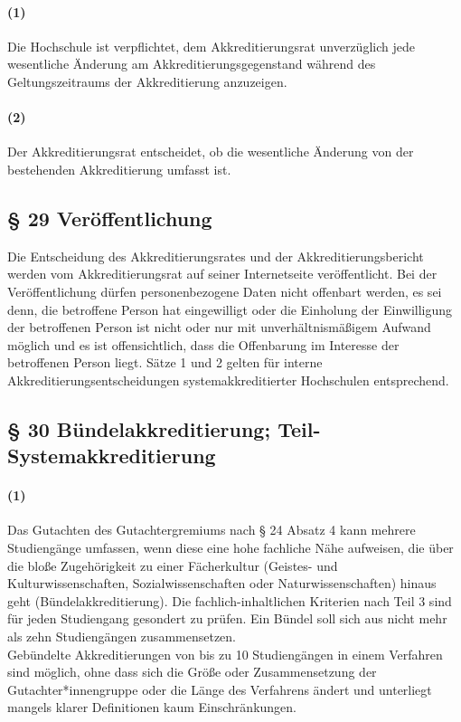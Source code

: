 \documentclass[a4paper]{scrartcl}
\begin{document}
\paragraph{(1) }Die Hochschule ist verpflichtet, dem Akkreditierungsrat unverzüglich jede wesentliche Änderung am Akkreditierungsgegenstand während des Geltungszeitraums der Akkreditierung anzuzeigen.
\paragraph{(2)} Der Akkreditierungsrat entscheidet, ob die wesentliche Änderung von der bestehenden Akkreditierung umfasst ist.
\subsection{§ 29 Veröffentlichung}
Die Entscheidung des Akkreditierungsrates und der Akkreditierungsbericht werden vom Akkreditierungsrat auf seiner Internetseite veröffentlicht. Bei der Veröffentlichung dürfen personenbezogene Daten nicht offenbart werden, es sei denn, die betroffene Person hat eingewilligt oder die Einholung der Einwilligung der betroffenen Person ist nicht oder nur mit unverhältnismäßigem Aufwand möglich und es ist offensichtlich, dass die Offenbarung im Interesse der betroffenen Person liegt. Sätze 1 und 2 gelten für interne Akkreditierungsentscheidungen systemakkreditierter Hochschulen entsprechend.
\subsection{§ 30 Bündelakkreditierung; Teil-Systemakkreditierung}
\paragraph{(1)} Das Gutachten des Gutachtergremiums nach § 24 Absatz 4 kann mehrere Studiengänge umfassen, wenn diese eine hohe fachliche Nähe aufweisen, die über die bloße Zugehörigkeit zu einer Fächerkultur (Geistes- und Kulturwissenschaften, Sozialwissenschaften oder Naturwissenschaften) hinaus geht (Bündelakkreditierung). Die fachlich-inhaltlichen Kriterien nach Teil 3 sind für jeden Studiengang gesondert zu prüfen. Ein Bündel soll sich aus nicht mehr als zehn Studiengängen zusammensetzen.
\\

\textcolor{Bernd}{\textbf{\cite{POS: WiSe2017-AkkRL}} Gebündelte Akkreditierungen von bis zu 10 Studiengängen in einem Verfahren sind möglich, ohne dass sich die Größe oder Zusammensetzung der Gutachter*innengruppe oder die Länge des Verfahrens ändert und unterliegt mangels klarer Definitionen kaum Einschränkungen.}
\end{document}
